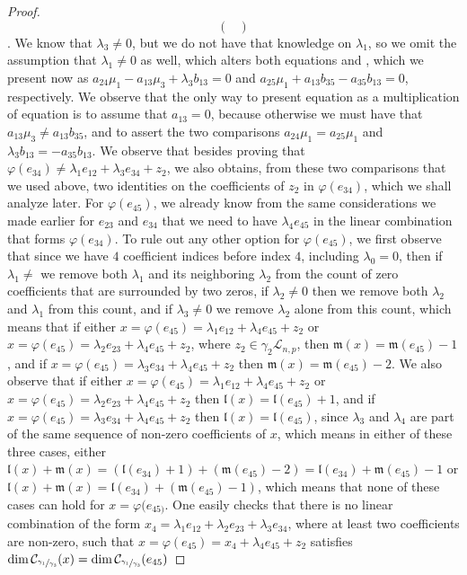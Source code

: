 \documentclass[12pt]{article}
\newcommand*\circled[1]{\tikz[baseline=(char.base)]{
            \small \node[shape=circle,draw,inner sep=1pt] (char) {#1};}}
\begin{document}
\begin{proof}
\[\begin{pmatrix}
\end{pmatrix}\]. We know that $\lambda_3\neq 0$, but we do not have that knowledge on $\lambda_1$, so we omit the assumption that $\lambda_1\neq 0$ as well, which alters both equations \circled{4} and \circled{6}, which we present now as $a_{24}\mu_1-a_{13}\mu_3+\lambda_3 b_{13}=0$ and $a_{25}\mu_1+a_{13}b_{35}-a_{35}b_{13}=0$, respectively. We observe that the only way to present equation \circled{6} as a multiplication of equation \circled{4} is to assume that $a_{13}=0$, because otherwise we must have that $a_{13}\mu_3\neq a_{13}b_{35}$, and to assert the two comparisons $a_{24}\mu_1=a_{25}\mu_1$ and $\lambda_3 b_{13}=-a_{35} b_{13}$. We observe that besides proving that $\varphi(e_{34})\neq\lambda_1 e_{12}+\lambda_3 e_{34}+z_2$, we also obtains, from these two comparisons that we used above, two identities on the coefficients of $z_2$ in $\varphi(e_{34})$, which we shall analyze later. For $\varphi(e_{45})$, we already know from the same considerations we made earlier for $e_{23}$ and $e_{34}$ that we need to have $\lambda_4 e_{45}$ in the linear combination that forms $\varphi(e_{34})$. To rule out any other option for $\varphi(e_{45})$, we first observe that since we have $4$ coefficient indices before index $4$, including $\lambda_0=0$, then if $\lambda_1\neq$ we remove both $\lambda_1$ and its neighboring $\lambda_2$ from the count of zero coefficients that are surrounded by two zeros, if $\lambda_2\neq 0$ then we remove both $\lambda_2$ and $\lambda_1$ from this count, and if $\lambda_3\neq 0$ we remove $\lambda_2$ alone from this count, which means that if either $x=\varphi(e_{45})=\lambda_1 e_{12}+\lambda_4 e_{45}+z_2$ or $x=\varphi(e_{45})=\lambda_2 e_{23}+\lambda_4 e_{45}+z_2$, where $z_2\in\gamma_2\mathcal{L}_{n,p}$, then $\mathfrak{m}(x)=\mathfrak{m}(e_{45})-1$, and if $x=\varphi(e_{45})=\lambda_3 e_{34}+\lambda_4 e_{45}+z_2$ then $\mathfrak{m}(x)=\mathfrak{m}(e_{45})-2$. We also observe that if either $x=\varphi(e_{45})=\lambda_1 e_{12}+\lambda_4 e_{45}+z_2$ or $x=\varphi(e_{45})=\lambda_2 e_{23}+\lambda_4 e_{45}+z_2$ then $\mathfrak{l}(x)=\mathfrak{l}(e_{45})+1$, and if $x=\varphi(e_{45})=\lambda_3 e_{34}+\lambda_4 e_{45}+z_2$ then $\mathfrak{l}(x)=\mathfrak{l}(e_{45})$, since $\lambda_3$ and $\lambda_4$ are part of the same sequence of non-zero coefficients of $x$, which means in either of these three cases, either $\mathfrak{l}(x)+\mathfrak{m}(x)=(\mathfrak{l}(e_{34})+1)+(\mathfrak{m}(e_{45})-2)=\mathfrak{l}(e_{34})+\mathfrak{m}(e_{45})-1$ or $\mathfrak{l}(x)+\mathfrak{m}(x)=\mathfrak{l}(e_{34})+(\mathfrak{m}(e_{45})-1)$, which means that none of these cases can hold for $x=\varphi(e_{45)}$. One easily checks that there is no linear combination of the form $x_4=\lambda_1 e_{12}+\lambda_2 e_{23}+\lambda_3 e_{34}$, where at least two coefficients are non-zero, such that $x=\varphi(e_{45})=x_4+\lambda_4 e_{45}+z_2$ satisfies $\dim\mathcal{C}_{\sfrac{\gamma_1}{\gamma_3}}(x)=\dim\mathcal{C}_{\sfrac{\gamma_1}{\gamma_3}}(e_{45})$




\end{proof}
\end{document}
